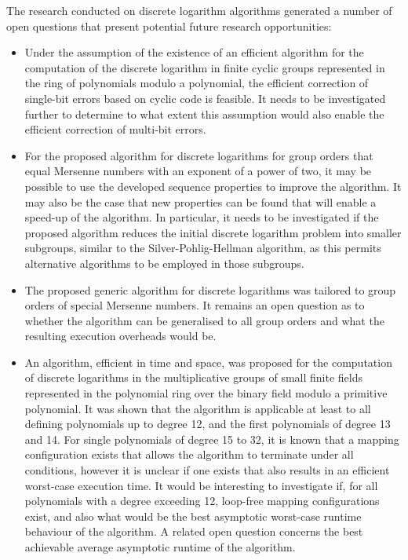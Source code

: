 \documentclass[a4paper, 11pt]{article}
\newcounter{subsubsubsection}[subsubsection]
\begin{document}
The research conducted on discrete logarithm algorithms generated a number of open questions that present potential future research opportunities:
\begin{itemize}
\item Under the assumption of the existence of an efficient algorithm for the computation of the discrete logarithm in finite cyclic groups represented in the ring of polynomials modulo a polynomial, the efficient correction of single-bit errors based on cyclic code is feasible. It needs to be investigated further to determine to what extent this assumption would also enable the efficient correction of multi-bit errors.

\item For the proposed algorithm for discrete logarithms for group orders that equal Mersenne numbers with an exponent of a power of two, it may be possible to use the developed sequence properties to improve the algorithm. It may also be the case that new properties can be found that will enable a speed-up of the algorithm. In particular, it needs to be investigated if the proposed algorithm reduces the initial discrete logarithm problem into smaller subgroups, similar to the Silver-Pohlig-Hellman algorithm, as this permits alternative algorithms to be employed in those subgroups.

\item The proposed generic algorithm for discrete logarithms was tailored to group orders of special Mersenne numbers. It remains an open question as to whether the algorithm can be generalised to all group orders and what the resulting execution overheads would be.

\item An algorithm, efficient in time and space, was proposed for the computation of discrete logarithms in the multiplicative groups of small finite fields represented in the polynomial ring over the binary field modulo a primitive polynomial. It was shown that the algorithm is applicable at least to all defining polynomials up to degree 12, and the first polynomials of degree 13 and 14. For single polynomials of degree 15 to 32, it is known that a mapping configuration exists that allows the algorithm to terminate under all conditions, however it is unclear if one exists that also results in an efficient worst-case execution time. It would be interesting to investigate if, for all polynomials with a degree exceeding 12, loop-free mapping configurations exist, and also what would be the best asymptotic worst-case runtime behaviour of the algorithm. A related open question concerns the best achievable average asymptotic runtime of the algorithm.


\end{itemize}
\end{document}
